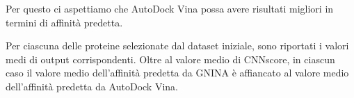 Per questo ci aspettiamo che AutoDock Vina possa avere risultati migliori in termini di affinità predetta. 

Per ciascuna delle proteine selezionate dal dataset iniziale, sono riportati i valori medi di output corrispondenti. Oltre al valore medio di CNNscore, in ciascun caso il valore medio dell'affinità predetta da GNINA è affiancato al valore medio dell'affinità predetta da AutoDock Vina. 

\begin{table}[H] 
\centering
{}
\end{table}
